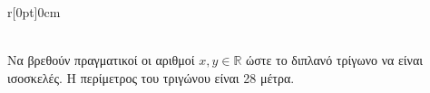 \documentclass[twoside,nofonts,internet]{askhseis}
\begin{document}
\begin{enumerate}[label=\bf\textcolor{royalblue}{{\large \arabic*.}},
itemsep=5mm]
\begin{minipage}{\textwidth}
\begin{wrapfigure}[10]{r}[0pt]{0cm}
   \end{wrapfigure}\mbox{}\\
Να βρεθούν πραγματικοί οι αριθμοί $ x, y\in\mathbb{R} $ ώστε το διπλανό τρίγωνο να είναι ισοσκελές. Η περίμετρος του τριγώνου είναι 28 μέτρα.
\end{minipage}\\\\
\end{enumerate}
\end{document}
